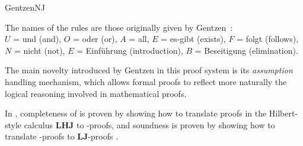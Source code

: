 \begin{entry}{GentzenNJ}
\begin{clarifications}
The names of the rules are those originally given by Gentzen~\cite{Gentzen1935}: \\
$U$ = und (and), $O$ = oder (or), $A$ = all, $E$ = es-gibt (exists), $F$ = folgt (follows), \\ 
$N$ = nicht (not), $E$ = Einf\"uhrung (introduction), $B$ = Beseitigung (elimination).
\end{clarifications}


\begin{history}
The main novelty introduced by Gentzen in this proof system is its 
\emph{assumption} handling mechanism, which allows formal proofs to reflect 
more naturally the logical reasoning involved in mathematical proofs.
\end{history}

\newcommand{\LHJ}{\ensuremath{\mathbf{LHJ}}\xspace}

\begin{technicalities}
In \cite{Gentzen1935}, completeness of \NJ is proven by showing how to translate proofs in the Hilbert-style calculus \LHJ {} to \NJ-proofs, and soundness is proven by showing how to translate \NJ-proofs to $\mathbf{LJ}$-proofs .
\end{technicalities}


\end{entry}
